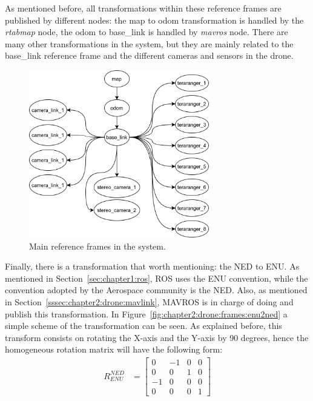 As mentioned before, all transformations within these reference frames are published by different nodes: the map to odom transformation is handled by the \emph{rtabmap} node, the odom to base\_link is handled by \emph{mavros} node. There are many other transformations in the system, but they are mainly related to the base\_link reference frame and the different cameras and sensors in the drone. \\
\begin{figure}
    \centering
    \includegraphics[width=0.7\textwidth]{Images/fig5-frames.png}
    \caption{Main reference frames in the system.}
    \label{fig:chapter2:drone:frames:frames}
\end{figure}

Finally, there is a transformation that worth mentioning: the \ac{NED} to \ac{ENU}. As mentioned in Section~\ref{sec:chapter1:ros}, ROS uses the ENU convention, while the convention adopted by the Aerospace community is the NED. Also, as mentioned in Section~\ref{sssec:chapter2:drone:mavlink}, MAVROS is in charge of doing and publish this transformation. In Figure~\ref{fig:chapter2:drone:frames:enu2ned} a simple scheme of the transformation can be seen. As explained before, this transform consists on rotating the X-axis and the Y-axis by 90 degrees, hence the homogeneous rotation matrix will have the following form:
\begin{align}
    R_{ENU}^{NED} & = \begin{bmatrix}
        0 & -1 & 0 & 0 \\
        0 & 0 & 1 & 0 \\
        -1 & 0 & 0 & 0 \\
        0 & 0 & 0 & 1
    \end{bmatrix}
\end{align}


